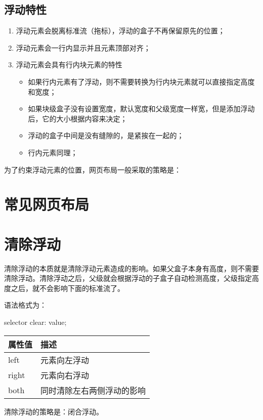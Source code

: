 \subsection{浮动特性}
\begin{enumerate}
    \item 浮动元素会脱离标准流（拖标），浮动的盒子不再保留原先的位置；
    \item 浮动元素会一行内显示并且元素顶部对齐；
    \item 浮动元素会具有行内块元素的特性
    \begin{itemize}
        \item 如果行内元素有了浮动，则不需要转换为行内块元素就可以直接指定高度和宽度；
        \item 如果块级盒子没有设置宽度，默认宽度和父级宽度一样宽，但是添加浮动后，它的大小根据内容来决定；
        \item 浮动的盒子中间是没有缝隙的，是紧挨在一起的；
        \item 行内元素同理；
    \end{itemize}
\end{enumerate}

为了约束浮动元素的位置，网页布局一般采取的策略是：
\section{常见网页布局}
\section{清除浮动}
清除浮动的本质就是清除浮动元素造成的影响。如果父盒子本身有高度，则不需要清除浮动。清除浮动之后，父级就会根据浮动的子盒子自动检测高度，父级指定高度之后，就不会影响下面的标准流了。

语法格式为：
\begin{css}
selector{
    clear: value;
}
\end{css}
\begin{table}[H]
    \centering
    \begin{tabular}{ll}
        \hline
        属性值&描述\\
        \hline
        left&元素向左浮动\\
        right&元素向右浮动\\
        both&同时清除左右两侧浮动的影响\\
        \hline
    \end{tabular}
\end{table}
清除浮动的策略是：闭合浮动。
